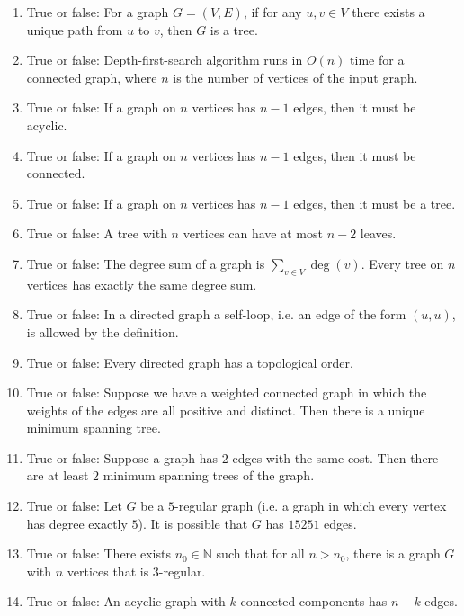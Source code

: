 \begin{gram}
\label{grm:intro-to-graph-theory::true}
\begin{enumerate}
    \item True or false: For a graph $G = (V, E)$, if for any $u, v \in V$ there exists a unique path from $u$ to $v$, then $G$ is a tree.
    \item True or false: Depth-first-search algorithm runs in $O(n)$ time for a connected graph, where $n$ is the number of vertices of the input graph.
    \item True or false: If a graph on $n$ vertices has $n-1$ edges, then it must be acyclic.
    \item True or false: If a graph on $n$ vertices has $n-1$ edges, then it must be connected.
    \item True or false: If a graph on $n$ vertices has $n-1$ edges, then it must be a tree.
    \item True or false: A tree with $n$ vertices can have at most $n - 2$ leaves.
    \item True or false: The degree sum of a graph is $\sum_{v \in V} \deg(v)$. Every tree on $n$ vertices has exactly the same degree sum.
    \item True or false: In a directed graph a self-loop, i.e. an edge of the form $(u,u)$, is allowed by the definition.
    \item True or false: Every directed graph has a topological order.
    \item True or false: Suppose we have a weighted connected graph in which the weights of the edges are all positive and distinct. Then there is a unique minimum spanning tree.
    \item True or false: Suppose a graph has $2$ edges with the same cost. Then there are at least $2$ minimum spanning trees of the graph.
    \item True or false: Let $G$ be a $5$-regular graph (i.e. a graph in which every vertex has degree exactly $5$). It is possible that $G$ has $15251$ edges.
    \item True or false: There exists $n_0 \in \mathbb{N}$ such that for all $n > n_0$, there is a graph $G$ with $n$ vertices that is $3$-regular.
    \item True or false: An acyclic graph with $k$ connected components has $n-k$ edges.
\end{enumerate}

\end{gram}



